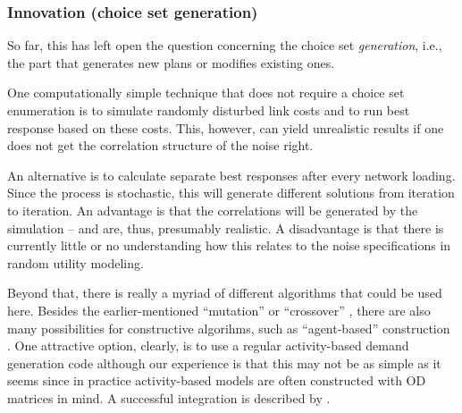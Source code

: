 \subsubsection{Innovation (choice set generation)}

So far, this has left open the question concerning the choice set
\emph{generation}, i.e., the part that generates new plans or modifies
existing ones.  

One computationally simple technique that does not require a choice
set enumeration is to simulate randomly disturbed link costs and to
run best response based on these costs. This, however, can yield
unrealistic results if one does not get the correlation structure of
the noise right.

An alternative is to calculate separate best responses after every
network loading.  Since the process is stochastic, this will generate
different solutions from iteration to iteration.  An advantage is that
the correlations will be generated by the simulation -- and are, thus,
presumably realistic.  A disadvantage is that there is currently
little or no understanding how this relates to the noise
specifications in random utility modeling.

Beyond that, there is really a myriad of different algorithms that
could be used here.  Besides the earlier-mentioned ``mutation''
\citep{BalmerRaneyEtAl2005act-times} or ``crossover''
\citep{CharyparNagel2005ga4acts,MeisterBalmerEtc2006planomatIatbr},
there are also many possibilities for constructive algorihms, such as
``agent-based'' construction
\citep{ZhuLevinsonZhang2008AgentBasedRouteChoice2}.  One attractive
option, clearly, is to use a regular activity-based demand generation
code \citep[e.g.,][]{BowmanEtc1999PortlandActs,MillerRoordaTASHA}
although our experience is that this may not be as simple as it seems
\citep{RieserNagelEtc2007early-berlin-trr} since in practice
activity-based models are often constructed with OD matrices in mind.  A successful integration is described by \cite{ZiemkeNagelBhatIntegratingCemdapMatsimTransferability}.





